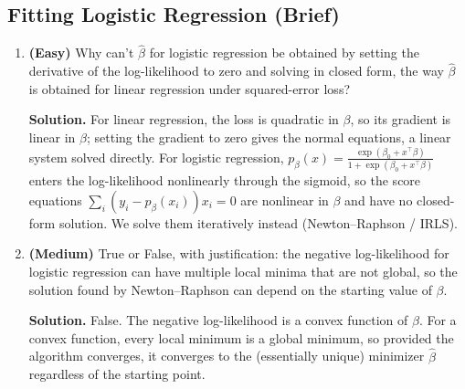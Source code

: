 \documentclass[11pt]{article}
\begin{document}
\subsection{Fitting Logistic Regression (Brief)}
\begin{enumerate}
\item \textbf{(Easy)} Why can't $\hat\beta$ for logistic regression be obtained by setting the derivative of the log-likelihood to zero and solving in closed form, the way $\hat\beta$ is obtained for linear regression under squared-error loss?

\textbf{Solution.} For linear regression, the loss is quadratic in $\beta$, so its gradient is linear in $\beta$; setting the gradient to zero gives the normal equations, a linear system solved directly. For logistic regression, $p_\beta(x)=\frac{\exp(\beta_0+x^\top\beta)}{1+\exp(\beta_0+x^\top\beta)}$ enters the log-likelihood nonlinearly through the sigmoid, so the score equations $\sum_i (y_i-p_\beta(x_i))x_i=0$ are nonlinear in $\beta$ and have no closed-form solution. We solve them iteratively instead (Newton--Raphson / IRLS).

\item \textbf{(Medium)} True or False, with justification: the negative log-likelihood for logistic regression can have multiple local minima that are not global, so the solution found by Newton--Raphson can depend on the starting value of $\beta$.

\textbf{Solution.} False. The negative log-likelihood is a convex function of $\beta$. For a convex function, every local minimum is a global minimum, so provided the algorithm converges, it converges to the (essentially unique) minimizer $\hat\beta$ regardless of the starting point.
\end{enumerate}
\end{document}
